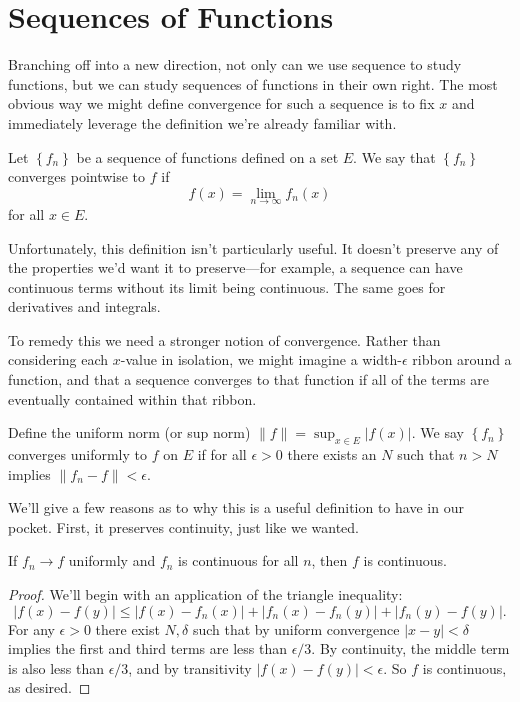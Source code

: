 \documentclass[../m131main.tex]{subfiles}
\begin{document}
\section{Sequences of Functions}
Branching off into a new direction, not only can we use sequence to study functions, but we can study sequences of functions in their own right.
The most obvious way we might define convergence for such a sequence is to fix $x$ and immediately leverage the definition we're already familiar with.

\begin{definition}
    Let $\left\{ f_n \right\}$ be a sequence of functions defined on a set $E$.
    We say that $\left\{ f_n \right\}$ converges pointwise to $f$ if
    \[ f(x) = \lim_{n \to \infty} f_n(x) \]
    for all $x \in E$.
\end{definition}

Unfortunately, this definition isn't particularly useful.
It doesn't preserve any of the properties we'd want it to preserve---for example, a sequence can have continuous terms without its limit being continuous.
The same goes for derivatives and integrals.

To remedy this we need a stronger notion of convergence.
Rather than considering each $x$-value in isolation, we might imagine a width-$\epsilon$ ribbon around a function, and that a sequence converges to that function if all of the terms are eventually contained within that ribbon.

\begin{definition}
    Define the uniform norm (or sup norm) $\| f \| = \sup_{x \in E} |f(x)|$.
We say $\left\{ f_n \right\}$ converges uniformly to $f$ on $E$ if for all $\epsilon > 0$ there exists an $N$ such that $n > N$ implies $\| f_n - f \| < \epsilon$.
\end{definition}

We'll give a few reasons as to why this is a useful definition to have in our pocket.
First, it preserves continuity, just like we wanted.

\begin{theorem}
    If $f_n \to f$ uniformly and $f_n$ is continuous for all $n$, then $f$ is continuous.
\end{theorem}

\begin{proof}
    We'll begin with an application of the triangle inequality:
    \[ |f(x) - f(y)| \leq |f(x) - f_n(x)| + |f_n(x) - f_n(y)| + |f_n(y) - f(y)|. \]
    For any $\epsilon > 0$ there exist $N,\delta$ such that by uniform convergence $|x - y| < \delta$ implies the first and third terms are less than $\epsilon / 3$.
    By continuity, the middle term is also less than $\epsilon / 3$, and by transitivity $|f(x) - f(y)| < \epsilon$.
    So $f$ is continuous, as desired.
\end{proof}
\end{document}
